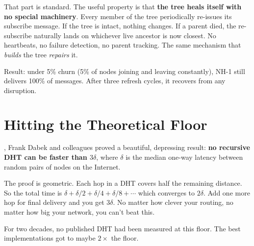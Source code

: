\documentclass[nobib]{tufte-handout}
\begin{document}
That part is standard. The useful property is that \textbf{the tree heals itself with no special machinery}. Every member of the tree periodically re-issues its subscribe message. If the tree is intact, nothing changes. If a parent died, the re-subscribe naturally lands on whichever live ancestor is now closest. No heartbeats, no failure detection, no parent tracking. The same mechanism that \emph{builds} the tree \emph{repairs} it.

Result: under 5\% churn (5\% of nodes joining and leaving constantly), NH-1 still delivers 100\% of messages. After three refresh cycles, it recovers from any disruption.

\section{Hitting the Theoretical Floor}

, Frank Dabek and colleagues proved a beautiful, depressing result: \textbf{no recursive DHT can be faster than $3\delta$}, where $\delta$ is the median one-way latency between random pairs of nodes on the Internet.

The proof is geometric. Each hop in a DHT covers half the remaining distance. So the total time is $\delta + \delta/2 + \delta/4 + \delta/8 + \cdots$ which converges to $2\delta$. Add one more hop for final delivery and you get $3\delta$. No matter how clever your routing, no matter how big your network, you can't beat this.

For two decades, no published DHT had been measured at this floor. The best implementations got to maybe $2\times$ the floor.
\end{document}
